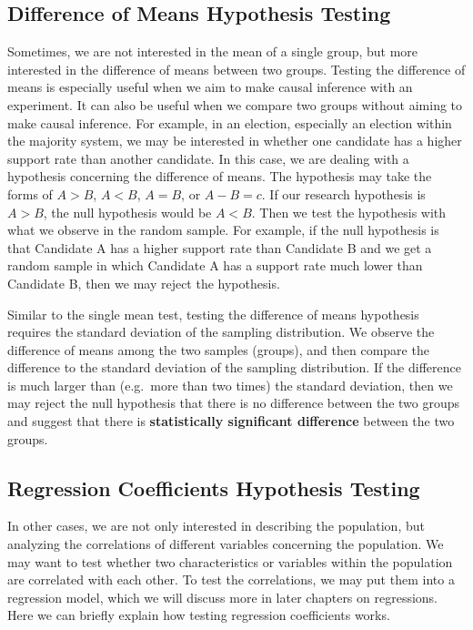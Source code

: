 \documentclass{book}
\begin{document}
\hypertarget{difference-of-means-hypothesis-testing}{%
\subsection{Difference of Means Hypothesis
Testing}\label{difference-of-means-hypothesis-testing}}

Sometimes, we are not interested in the mean of a single group, but more
interested in the difference of means between two groups. Testing the
difference of means is especially useful when we aim to make causal inference
with an experiment. It can also be useful when we compare two groups without
aiming to make causal inference. For example, in an election, especially an
election within the majority system, we may be interested in whether one
candidate has a higher support rate than another candidate. In this case, we
are dealing with a hypothesis concerning the difference of means. The
hypothesis may take the forms of \(A>B\), \(A<B\), \(A=B\), or \(A-B=c\). If
our research hypothesis is \(A>B\), the null hypothesis would be \(A<B\). Then
we test the hypothesis with what we observe in the random sample. For example,
if the null hypothesis is that Candidate A has a higher support rate than
Candidate B and we get a random sample in which Candidate A has a support rate
much lower than Candidate B, then we may reject the hypothesis.

Similar to the single mean test, testing the difference of means hypothesis
requires the standard deviation of the sampling distribution. We observe the
difference of means among the two samples (groups), and then compare the
difference to the standard deviation of the sampling distribution. If the
difference is much larger than (e.g.~more than two times) the standard
deviation, then we may reject the null hypothesis that there is no difference
between the two groups and suggest that there is \textbf{statistically
significant difference} between the two groups.

\hypertarget{regression-coefficients-hypothesis-testing}{%
\subsection{Regression Coefficients Hypothesis
Testing}\label{regression-coefficients-hypothesis-testing}}

In other cases, we are not only interested in describing the population, but
analyzing the correlations of different variables concerning the population.
We may want to test whether two characteristics or variables within the
population are correlated with each other. To test the correlations, we may
put them into a regression model, which we will discuss more in later chapters
on regressions. Here we can briefly explain how testing regression
coefficients works.
\end{document}
